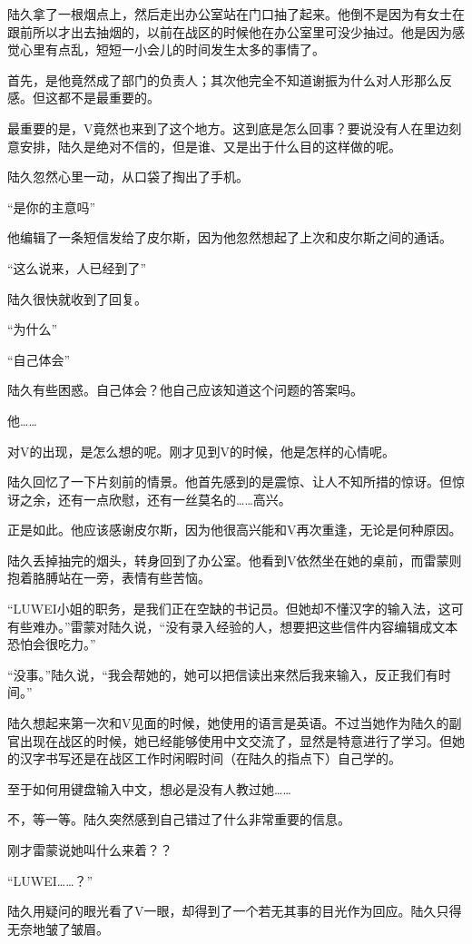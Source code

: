 陆久拿了一根烟点上，然后走出办公室站在门口抽了起来。他倒不是因为有女士在跟前所以才出去抽烟的，以前在战区的时候他在办公室里可没少抽过。他是因为感觉心里有点乱，短短一小会儿的时间发生太多的事情了。

首先，是他竟然成了部门的负责人；其次他完全不知道谢振为什么对人形那么反感。但这都不是最重要的。

最重要的是，V竟然也来到了这个地方。这到底是怎么回事？要说没有人在里边刻意安排，陆久是绝对不信的，但是谁、又是出于什么目的这样做的呢。

陆久忽然心里一动，从口袋了掏出了手机。

“是你的主意吗”

他编辑了一条短信发给了皮尔斯，因为他忽然想起了上次和皮尔斯之间的通话。

“这么说来，人已经到了”

陆久很快就收到了回复。

“为什么”

“自己体会”

陆久有些困惑。自己体会？他自己应该知道这个问题的答案吗。

他……

对V的出现，是怎么想的呢。刚才见到V的时候，他是怎样的心情呢。

陆久回忆了一下片刻前的情景。他首先感到的是震惊、让人不知所措的惊讶。但惊讶之余，还有一点欣慰，还有一丝莫名的……高兴。

正是如此。他应该感谢皮尔斯，因为他很高兴能和V再次重逢，无论是何种原因。

陆久丢掉抽完的烟头，转身回到了办公室。他看到V依然坐在她的桌前，而雷蒙则抱着胳膊站在一旁，表情有些苦恼。

“LUWEI小姐的职务，是我们正在空缺的书记员。但她却不懂汉字的输入法，这可有些难办。”雷蒙对陆久说，“没有录入经验的人，想要把这些信件内容编辑成文本恐怕会很吃力。”

“没事。”陆久说，“我会帮她的，她可以把信读出来然后我来输入，反正我们有时间。”

陆久想起来第一次和V见面的时候，她使用的语言是英语。不过当她作为陆久的副官出现在战区的时候，她已经能够使用中文交流了，显然是特意进行了学习。但她的汉字书写还是在战区工作时闲暇时间（在陆久的指点下）自己学的。

至于如何用键盘输入中文，想必是没有人教过她……

不，等一等。陆久突然感到自己错过了什么非常重要的信息。

刚才雷蒙说她叫什么来着？？

“LUWEI……？”

陆久用疑问的眼光看了V一眼，却得到了一个若无其事的目光作为回应。陆久只得无奈地皱了皱眉。

